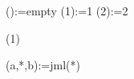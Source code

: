 \documentclass[12pt]{article}
\begin{document}

\jml():={empty}
\jml(1):={1}
\jml(2):={2}

\thejml(1)

(a,*,b):=jml(*)

\end{document}
